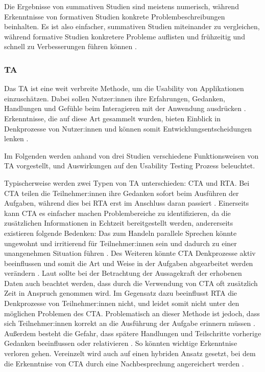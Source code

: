 Die Ergebnisse von summativen Studien sind meistens numerisch, während Erkenntnisse von formativen Studien konkrete Problembeschreibungen beinhalten. Es ist also einfacher, summativen Studien miteinander zu vergleichen, während formative Studien konkretere Probleme auflisten und frühzeitig und schnell zu Verbesserungen führen können \parencite{barnumUsabilityTesting2021}.

\subsubsection{\acl{TA}}
\label{sec:think-aloud}

Das \acf{TA} ist eine weit verbreite Methode, um die Usability von Applikationen einzuschätzen. Dabei sollen Nutzer:innen ihre Erfahrungen, Gedanken, Handlungen und Gefühle beim Interagieren mit der Anwendung ausdrücken \parencite{barnumUsabilityTesting2021}. Erkenntnisse, die auf diese Art gesammelt wurden, bieten Einblick in Denkprozesse von Nutzer:innen und können somit Entwicklungsentscheidungen lenken \parencite{alhadretiRethinkingThinking2018}.

Im Folgenden werden anhand von drei Studien verschiedene Funktionsweisen von \ac{TA} vorgestellt, und Auswirkungen auf den Usability Testing Prozess beleuchtet.

Typischerweise werden zwei Typen von \ac{TA} unterschieden: \ac{CTA} und \ac{RTA}. Bei \ac{CTA} teilen die Teilnehmer:innen ihre Gedanken sofort beim Ausführen der Aufgaben, während dies bei \ac{RTA} erst im Anschluss daran passiert \parencite{alhadretiRethinkingThinking2018}. Einerseits kann \ac{CTA} es einfacher machen Problembereiche zu identifizieren, da die zusätzlichen Informationen in Echtzeit bereitgestellt werden, andererseits existieren folgende Bedenken: Das zum Handeln parallele Sprechen könnte ungewohnt und irritierend für Teilnehmer:innen sein und dadurch zu einer unangenehmen Situation führen \parencite{alhadretiRethinkingThinking2018}. Des Weiteren könnte \ac{CTA} Denkprozesse aktiv beeinflussen und somit die Art und Weise in der Aufgaben abgearbeitet werden verändern \parencite{alhadretiRethinkingThinking2018}. Laut \citeauthor{alhadretiRethinkingThinking2018} sollte bei der Betrachtung der Aussagekraft der erhobenen Daten auch beachtet werden, dass durch die Verwendung von \ac{CTA} oft zusätzlich Zeit in Anspruch genommen wird. Im Gegensatz dazu beeinflusst \ac{RTA} die Denkprozesse von Teilnehmer:innen nicht, und leidet somit nicht unter den möglichen Problemen des \ac{CTA}. Problematisch an dieser Methode ist jedoch, dass sich Teilnehmer:innen korrekt an die Ausführung der Aufgabe erinnern müssen \parencite{alhadretiRethinkingThinking2018}. Außerdem besteht die Gefahr, dass spätere Handlungen und Teilschritte vorherige Gedanken beeinflussen oder relativieren \parencite{alhadretiRethinkingThinking2018}. So könnten wichtige Erkenntnise verloren gehen. Vereinzelt wird auch auf einen hybriden Ansatz gesetzt, bei dem die Erkenntnise von \ac{CTA} durch eine Nachbesprechung
angereichert werden \parencite{alhadretiRethinkingThinking2018}.

